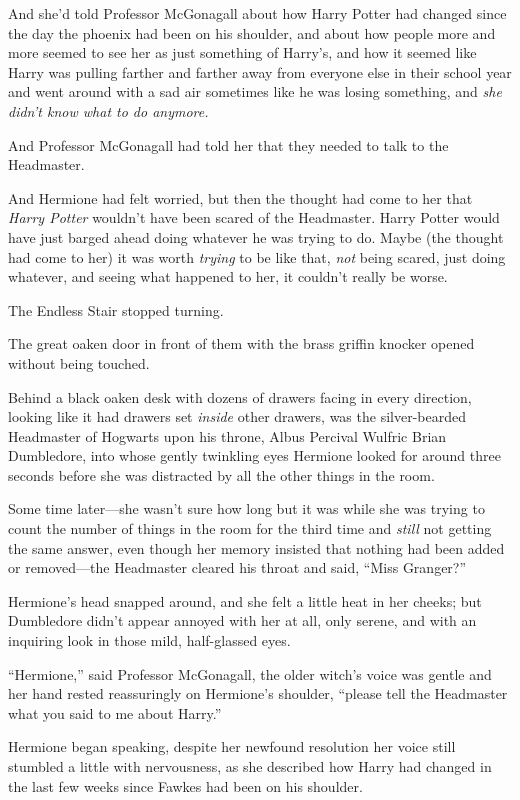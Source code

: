 And she'd told Professor McGonagall about how Harry Potter had changed
since the day the phoenix had been on his shoulder, and about how people
more and more seemed to see her as just something of Harry's, and how it
seemed like Harry was pulling farther and farther away from everyone
else in their school year and went around with a sad air sometimes like
he was losing something, and \emph{she didn't know what to do anymore.}

And Professor McGonagall had told her that they needed to talk to the
Headmaster.

And Hermione had felt worried, but then the thought had come to her that
\emph{Harry Potter} wouldn't have been scared of the Headmaster. Harry
Potter would have just barged ahead doing whatever he was trying to do.
Maybe (the thought had come to her) it was worth \emph{trying} to be
like that, \emph{not} being scared, just doing whatever, and seeing what
happened to her, it couldn't really be worse.

The Endless Stair stopped turning.

The great oaken door in front of them with the brass griffin knocker
opened without being touched.

Behind a black oaken desk with dozens of drawers facing in every
direction, looking like it had drawers set \emph{inside} other drawers,
was the silver-bearded Headmaster of Hogwarts upon his throne, Albus
Percival Wulfric Brian Dumbledore, into whose gently twinkling eyes
Hermione looked for around three seconds before she was distracted by
all the other things in the room.

Some time later---she wasn't sure how long but it was while she was
trying to count the number of things in the room for the third time and
\emph{still} not getting the same answer, even though her memory
insisted that nothing had been added or removed---the Headmaster cleared
his throat and said, ``Miss Granger?''

Hermione's head snapped around, and she felt a little heat in her
cheeks; but Dumbledore didn't appear annoyed with her at all, only
serene, and with an inquiring look in those mild, half-glassed eyes.

``Hermione,'' said Professor McGonagall, the older witch's voice was
gentle and her hand rested reassuringly on Hermione's shoulder, ``please
tell the Headmaster what you said to me about Harry.''

Hermione began speaking, despite her newfound resolution her voice still
stumbled a little with nervousness, as she described how Harry had
changed in the last few weeks since Fawkes had been on his shoulder.

